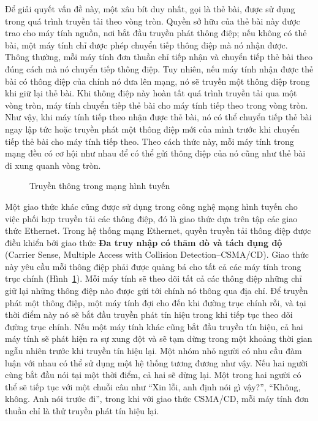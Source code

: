 Để giải quyết vấn đề này, một xâu bít duy nhất, gọi là thẻ bài, được sử dụng trong quá
trình truyền tải theo vòng tròn. Quyền sở hữu của thẻ bài này được trao cho máy tính
nguồn, nơi bắt đầu truyền phát thông điệp; nếu không có thẻ bài, một máy tính chỉ được
phép chuyển tiếp thông điệp mà nó nhận được. Thông thường, mỗi máy tính đơn thuần chỉ tiếp
nhận và chuyển tiếp thẻ bài theo đúng cách mà nó chuyển tiếp thông điệp. Tuy nhiên, nếu
máy tính nhận được thẻ bài có thông điệp của chính nó đưa lên mạng, nó sẽ truyền một thông
điệp trong khi giữ lại thẻ bài. Khi thông điệp này hoàn tất quá trình truyền tải qua một
vòng tròn, máy tính chuyển tiếp thẻ bài cho máy tính tiếp theo trong vòng tròn. Như vậy,
khi máy tính tiếp theo nhận được thẻ bài, nó có thể chuyển tiếp thẻ bài ngay lập tức hoặc
truyền phát một thông điệp mới của mình trước khi chuyển tiếp thẻ bài cho máy tính tiếp
theo. Theo cách thức này, mỗi máy tính trong mạng đều có cơ hội như nhau để có thể gửi
thông điệp của nó cũng như thẻ bài đi xung quanh vòng tròn.


\begin{figure}[tbh]
\centering
    \caption{Truyền thông trong mạng hình tuyến}
  \label{fig:fig4.3}
\end{figure}

Một giao thức khác cũng được sử dụng trong công nghệ mạng hình tuyến cho việc phối hợp
truyền tải các thông điệp, đó là giao thức dựa trên tập các giao thức Ethernet. Trong hệ
thống mạng Ethernet, quyền truyền tải thông điệp được điều khiển bởi giao thức \textbf{Đa
  truy nhập có thăm dò và tách đụng độ} (Carrier Sense, Multiple Access with Collision
Detection--CSMA/CD). Giao thức này yêu cầu mỗi thông điệp phải được quảng bá cho tất cả
các máy tính trong trục chính (Hình~\ref{fig:fig4.3}). Mỗi máy tính sẽ theo dõi tất cả các
thông điệp những chỉ giữ lại những thông điệp nào được gửi tới chính nó thông qua địa
chỉ. Để truyền phát một thông điệp, một máy tính đợi cho đến khi đường trục chính rỗi, và
tại thời điểm này nó sẽ bắt đầu truyền phát tín hiệu trong khi tiếp tục theo dõi đường
trục chính. Nếu một máy tính khác cũng bắt đầu truyền tín hiệu, cả hai máy tính sẽ phát
hiện ra sự xung đột và sẽ tạm dừng trong một khoảng thời gian ngẫu nhiên trước khi truyền
tín hiệu lại. Một nhóm nhỏ người có nhu cầu đàm luận với nhau có thể sử dụng một hệ thống
tương đương như vậy. Nếu hai người cùng bắt đầu nói tại một thời điểm, cả hai sẽ dừng
lại. Một trong hai người có thể sẽ tiếp tục với một chuỗi câu như ``Xin lỗi, anh định nói
gì vậy?'', ``Không, không. Anh nói trước đi'', trong khi với giao thức CSMA/CD, mỗi máy
tính đơn thuần chỉ là thử truyền phát tín hiệu lại.


